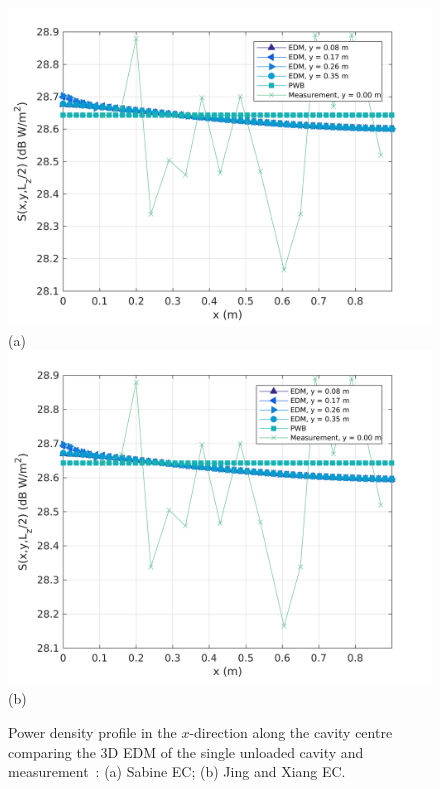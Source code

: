 \documentclass[a4paper]{article}
\numberwithin{equation}{section}
\begin{document}
\begin{figure}[ht]
\begin{center}
\includegraphics[width=0.6\linewidth]{figures/SDM_3D_SU_PowerDensityProfileXMeas}\\
{\footnotesize (a)}\\
\vspace{2mm}
\includegraphics[width=0.6\linewidth]{figures/SDM_3D_SU_PowerDensityProfileXMeas_JX}\\
{\footnotesize (b)}\\
\vspace{-2mm}
\caption{\label{fg:measprofssu} Power density profile in the $x$-direction along the cavity centre comparing
the 3D EDM of the single unloaded cavity and measurement~\citep{Flintoft2017b}: (a) Sabine EC; (b) Jing and Xiang EC.}
\end{center}
\end{figure}
\end{document}
